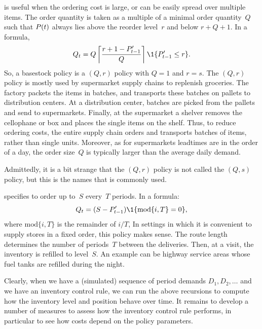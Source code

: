 \documentclass[queueing-book.tex]{subfiles}
\begin{document}
 is useful when the ordering cost is large, or can be easily spread over multiple items.
The order quantity is taken as a multiple of a minimal order quantity~$Q$ such that $P(t)$ always lies above the reorder level~$r$ and below $r+Q+1$.
In a formula,
\begin{equation*}
  Q_t = Q \left\lceil \frac{r+1-\IP_{t-1}'}{Q} \right\rceil \1{\IP_{t-1}'\leq r}.
\end{equation*}
So, a basestock policy is a $(Q,r)$ policy with $Q=1$ and $r=s$.
The $(Q,r)$ policy is mostly used by  supermarket supply chains to replenish groceries.
The factory packets the items in batches, and transports these batches on pallets to distribution centers.
At a distribution center, batches are picked from the pallets and send to supermarkets.
Finally, at the supermarket a shelver removes the cellophane or box and places the single items on the shelf.
Thus, to reduce ordering costs, the entire supply chain orders and transports batches of items, rather than single units.
Moreover, as for supermarkets leadtimes are  in the order of a day, the  order size~$Q$ is typically larger than the average daily demand.

Admittedly, it is a bit strange that the $(Q,r)$ policy is not called the $(Q,s)$ policy, but this is the names that is commonly used.


  specifies to order up to~$S$ every~$T$ periods. In a formula:
\begin{equation*}
  Q_t = (S-\IP_{t-1}')\1{\text{mod}\{i, T\}=0},
\end{equation*}
where $\text{mod}\{i, T\}$ is the remainder of $i/T$, In settings in which it is convenient to supply stores in a fixed order, this policy makes sense.
The route length determines the number of periods~$T$ between the deliveries.
Then, at a visit, the inventory is refilled to level~$S$. An example can be highway service areas whose fuel tanks are refilled during the night.


Clearly, when we have a (simulated) sequence of period demands $D_{1}, D_{2}, \ldots$ and we have an inventory control rule, we can run the above recursions to compute how the inventory level and position behave over time.
It remains to develop a number of measures to assess how the inventory control rule performs, in particular to see how costs depend on the policy parameters.
\end{document}
